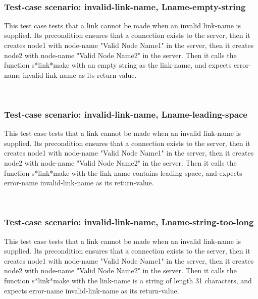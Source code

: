 \
\subsubsection {Test-case scenario: invalid-link-name, Lname-empty-string}


This test case tests that a link cannot be made when an invalid link-name is supplied.
Its precondition ensures that a connection exists to the server, then it creates node1 with node-name "Valid Node Name1" in the server, then it creates node2 with node-name  "Valid Node Name2" in the server.
Then it calls the function s*link*make  with an empty string as the link-name, and expects error-name invalid-link-name as its return-value.





\
\subsubsection {Test-case scenario: invalid-link-name, Lname-leading-space}


This test case tests that a link cannot be made when an invalid link-name is supplied.
Its precondition ensures that a connection exists to the server, then it creates node1 with node-name "Valid Node Name1" in the server, then it creates node2 with node-name  "Valid Node Name2" in the server.
Then it calls the function s*link*make  with the link name contains leading space, and expects error-name invalid-link-name as its return-value.





\
\subsubsection {Test-case scenario: invalid-link-name, Lname-string-too-long}


This test case tests that a link cannot be made when an invalid link-name is supplied.
Its precondition ensures that a connection exists to the server, then it creates node1 with node-name "Valid Node Name1" in the server, then it creates node2 with node-name  "Valid Node Name2" in the server.
Then it calls the function s*link*make  with the link-name is a string of length 31 characters, and expects error-name invalid-link-name as its return-value.





